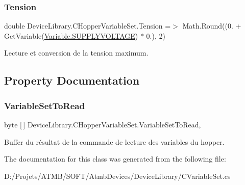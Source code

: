 \subsubsection{\texorpdfstring{Tension}{Tension}}
{\footnotesize\ttfamily double Device\+Library.\+C\+Hopper\+Variable\+Set.\+Tension =$>$ Math.\+Round((0. + Get\+Variable(\mbox{\hyperlink{class_device_library_1_1_c_hopper_variable_set_a3b79d051f89692abb5d34ae3f4e946bea7040277bb149f1bd783b3f78ad856099}{Variable.\+S\+U\+P\+P\+L\+Y\+V\+O\+L\+T\+A\+GE}}) $\ast$ 0.), 2)}



Lecture et conversion de la tension maximum. 



\subsection{Property Documentation}
\mbox{\label{class_device_library_1_1_c_hopper_variable_set_a4ab954fb5d79fdaa7d4cebc7922b3c78}} 
\subsubsection{\texorpdfstring{Variable\+Set\+To\+Read}{VariableSetToRead}}
{\footnotesize\ttfamily byte \mbox{[}$\,$\mbox{]} Device\+Library.\+C\+Hopper\+Variable\+Set.\+Variable\+Set\+To\+Read\hspace{0.3cm}{\ttfamily [get]}, {\ttfamily [set]}}



Buffer du résultat de la commande de lecture des variables du hopper. 



The documentation for this class was generated from the following file\+:\begin{DoxyCompactItemize}
\item 
D\+:/\+Projets/\+A\+T\+M\+B/\+S\+O\+F\+T/\+Atmb\+Devices/\+Device\+Library/C\+Variable\+Set.\+cs\end{DoxyCompactItemize}

